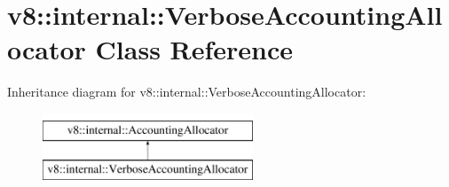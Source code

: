 \hypertarget{classv8_1_1internal_1_1VerboseAccountingAllocator}{}\section{v8\+:\+:internal\+:\+:Verbose\+Accounting\+Allocator Class Reference}
\label{classv8_1_1internal_1_1VerboseAccountingAllocator}
Inheritance diagram for v8\+:\+:internal\+:\+:Verbose\+Accounting\+Allocator\+:\begin{figure}[H]
\begin{center}
\leavevmode
\includegraphics[height=2.000000cm]{classv8_1_1internal_1_1VerboseAccountingAllocator}
\end{center}
\end{figure}
